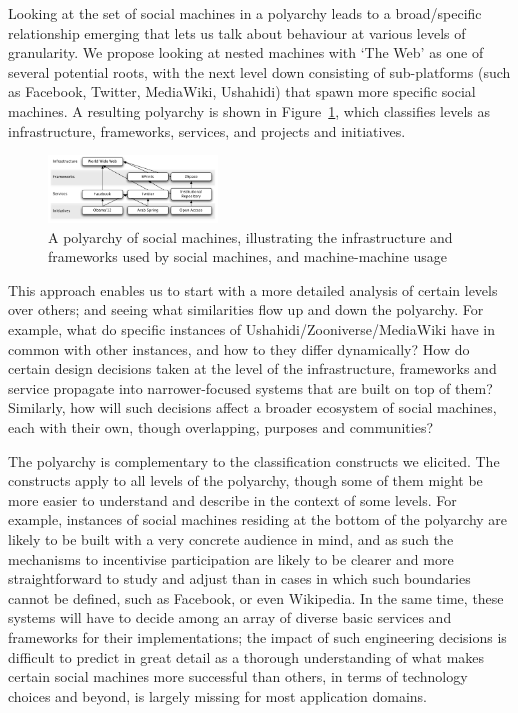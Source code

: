 \documentclass{sig-alternate}
\begin{document}
Looking at the set of social machines in a polyarchy leads to a broad/specific relationship emerging that lets us talk about behaviour at various levels of granularity. We propose looking at nested machines with `The Web' as one of several potential roots, with the next level down consisting of sub-platforms (such as Facebook, Twitter, MediaWiki, Ushahidi) that spawn more specific social machines. A resulting polyarchy is shown in Figure~\ref{polyarchy}, which classifies levels as infrastructure, frameworks, services, and projects and initiatives.

\begin{figure}[htb]
\begin{center}
\includegraphics[width=0.4\textwidth]{img/polyarchy.pdf}
\caption{A polyarchy of social machines, illustrating the infrastructure and frameworks used by social machines, and machine-machine usage} \label{polyarchy}
\end{center}
\end{figure}

This approach enables us to start with a more detailed analysis of certain levels over others;
and seeing what similarities flow up and down the polyarchy. For example, what do
specific instances of Ushahidi/Zooniverse/MediaWiki have in common with other instances, and
how to they differ dynamically? How do certain design decisions taken at the level of the infrastructure, frameworks and service propagate into narrower-focused systems that are built on top of them? Similarly, how will such decisions affect a broader ecosystem of social machines, each with their own, though overlapping, purposes and communities?

The polyarchy is complementary to the classification constructs we elicited. The constructs apply to all levels of the polyarchy, though some of them might be more easier to understand and describe in the context of some levels. For example, instances of social machines residing at the bottom of the polyarchy are likely to be built with a very concrete audience in mind, and as such the mechanisms to incentivise participation are likely to be clearer and more straightforward to study and adjust than in cases in which such boundaries cannot be defined, such as Facebook, or even Wikipedia. In the same time, these systems will have to decide among an array of diverse basic services and frameworks for their implementations; the impact of such engineering decisions is difficult to predict in great detail as a thorough understanding of what makes certain social machines more successful than others, in terms of technology choices and beyond, is largely missing for most application domains.
\end{document}
